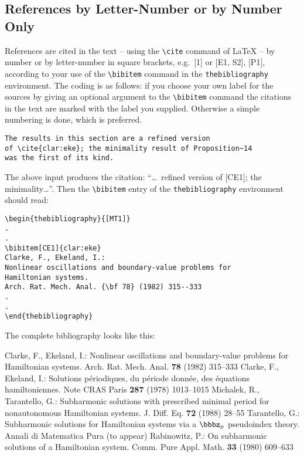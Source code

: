 \subsection{References by Letter-Number or by Number Only}
%
References are cited in the text -- using the \verb|\cite|
command of \LaTeX{} -- by number or by letter-number in square
brackets, e.g.\ [1] or [E1, S2], [P1], according to your use of the
\verb|\bibitem| command in the \verb|thebibliography| environment. The
coding is as follows: if you choose your own label for the sources by
giving an optional argument to the \verb|\bibitem| command the citations
in the text are marked with the label you supplied. Otherwise a simple
numbering is done, which is preferred.
\begin{verbatim}
The results in this section are a refined version
of \cite{clar:eke}; the minimality result of Proposition~14
was the first of its kind.
\end{verbatim}
The above input produces the citation: ``\dots\ refined version of
[CE1]; the min\-i\-mality\dots''. Then the \verb|\bibitem| entry of
the \verb|thebibliography| environment should read:
\begin{verbatim}
\begin{thebibliography}{[MT1]}
.
.
\bibitem[CE1]{clar:eke}
Clarke, F., Ekeland, I.:
Nonlinear oscillations and boundary-value problems for
Hamiltonian systems.
Arch. Rat. Mech. Anal. {\bf 78} (1982) 315--333
.
.
\end{thebibliography}
\end{verbatim}
The complete bibliography looks like this:
%
\begin{thebibliography}{[MT1]}
%
Clarke, F., Ekeland, I.:
Nonlinear oscillations and
boundary-value problems for Hamiltonian systems.
Arch. Rat. Mech. Anal. {\bf 78} (1982) 315--333
%
Clarke, F., Ekeland, I.:
Solutions p\'{e}riodiques, du
p\'{e}riode donn\'{e}e, des \'{e}quations hamiltoniennes.
Note CRAS Paris {\bf 287} (1978) 1013--1015
%
Michalek, R., Tarantello, G.:
Subharmonic solutions with prescribed minimal
period for nonautonomous Hamiltonian systems.
J. Diff. Eq. {\bf 72} (1988) 28--55
%
Tarantello, G.:
Subharmonic solutions for Hamiltonian
systems via a $\bbbz_{p}$ pseudoindex theory.
Annali di Matematica Pura (to appear)
%
Rabinowitz, P.:
On subharmonic solutions of a Hamiltonian system.
Comm. Pure Appl. Math. {\bf 33} (1980) 609--633
\end{thebibliography}
%

